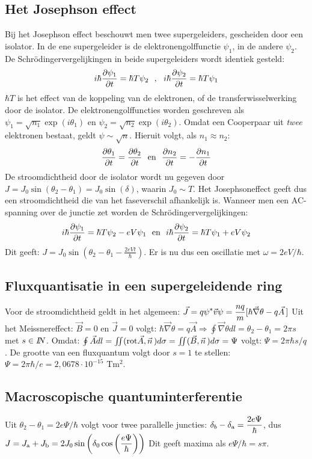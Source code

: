 \documentclass[twoside]{report}
\begin{document}
\subsection{Het Josephson effect}
Bij het Josephson effect beschouwt men twee supergeleiders, gescheiden door
een isolator. In de ene supergeleider is de elektronengolffunctie $\psi_1$,
in de andere $\psi_2$. De Schr\"odinger\-vergelijkingen in beide
supergeleiders wordt identiek gesteld:
\[
i\hbar\frac{\partial \psi_1}{\partial t}=\hbar T\psi_2~~,~~i\hbar\frac{\partial \psi_2}{\partial t}=\hbar T\psi_1
\]
$\hbar T$ is het effect van de koppeling van de elektronen, of de
transferwisselwerking door de isolator. De elektronengolffuncties worden
geschreven als $\psi_1=\sqrt{n_1}\exp(i\theta_1)$ en
$\psi_2=\sqrt{n_2}\exp(i\theta_2)$.
Omdat een Cooperpaar uit {\em twee} elektronen bestaat, geldt
$\psi\sim\sqrt{n}$. Hieruit volgt, als $n_1\approx n_2$:
\[
\frac{\partial \theta_1}{\partial t}=\frac{\partial \theta_2}{\partial t}~~\mbox{en}~~\frac{\partial n_2}{\partial t}=-\frac{\partial n_1}{\partial t}
\]
De stroomdichtheid door de isolator wordt nu gegeven door
$J=J_0\sin(\theta_2-\theta_1)=J_0\sin(\delta)$, waarin $J_0\sim T$.
Het Josephsoneffect geeft dus een stroomdichtheid die van het faseverschil
afhankelijk is. Wanneer men een AC-spanning over de junctie zet worden de
Schr\"odingervergelijkingen:
\[
i\hbar\frac{\partial \psi_1}{\partial t}=\hbar T\psi_2-eV\psi_1~~\mbox{en}~~
i\hbar\frac{\partial \psi_2}{\partial t}=\hbar T\psi_1+eV\psi_2
\]
Dit geeft:
$\displaystyle J=J_0\sin\left(\theta_2-\theta_1-\frac{2eVt}{\hbar}\right)$.
\npar
Er is nu dus een oscillatie met $\omega=2eV/\hbar$.

\subsection{Fluxquantisatie in een supergeleidende ring}
Voor de stroomdichtheid geldt in het algemeen:
$\displaystyle\vec{J}=q\psi^*\vec{v}\psi=\frac{nq}{m}[\hbar\vec{\nabla}\theta-q\vec{A}\,]$
\npar
Uit het Meissnereffect: $\vec{B}=0$ en $\vec{J}=0$ volgt:
$\hbar\vec{\nabla}\theta=q\vec{A}
\Rightarrow\oint\vec{\nabla}\theta dl=\theta_2-\theta_1=2\pi s$ met $s\in I\hspace{-1mm}N$.
Omdat: $\oint\vec{A}dl=\int\hspace*{-1.5mm}\int(\mbox{rot}\vec{A},\vec{n}\,)d\sigma=
\int\hspace*{-1.5mm}\int(\vec{B},\vec{n}\,)d\sigma=\Psi$ volgt:
$\Psi=2\pi\hbar s/q$. De grootte van een fluxquantum volgt door $s=1$ te
stellen: $\Psi=2\pi\hbar/e=2,0678\cdot10^{-15}$ Tm$^2$.

\subsection{Macroscopische quantuminterferentie}
Uit $\theta_2-\theta_1=2e\Psi/\hbar$ volgt voor twee parallelle juncties:
$\displaystyle\delta_b-\delta_{\rm a}=\frac{2e\Psi}{\hbar}$, dus
\npar
$\displaystyle
J=J_{\rm a}+J_{\rm b}=2J_0\sin\left(\delta_0\cos\left(\frac{e\Psi}{\hbar}\right)\right)
$
Dit geeft maxima als $e\Psi/\hbar=s\pi$.
\end{document}
